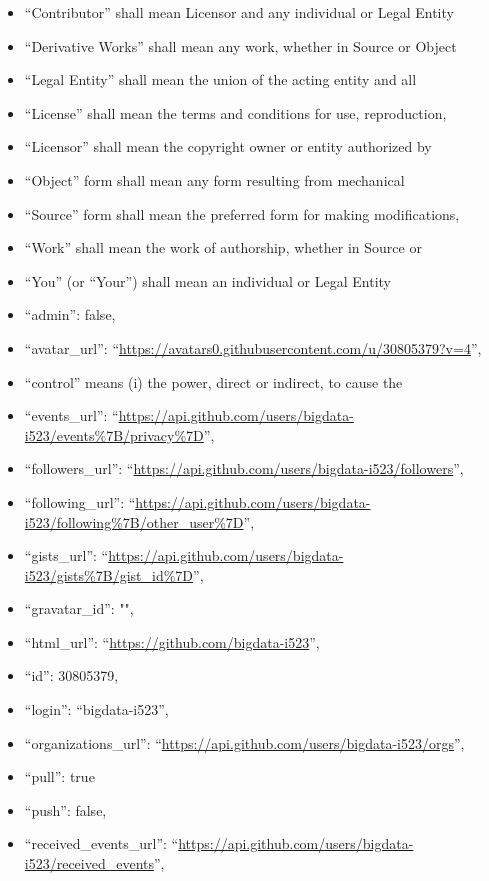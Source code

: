 \begin{itemize}
\item
  ``Contributor'' shall mean Licensor and any individual or Legal Entity
\item
  ``Derivative Works'' shall mean any work, whether in Source or Object
\item
  ``Legal Entity'' shall mean the union of the acting entity and all
\item
  ``License'' shall mean the terms and conditions for use, reproduction,
\item
  ``Licensor'' shall mean the copyright owner or entity authorized by
\item
  ``Object'' form shall mean any form resulting from mechanical
\item
  ``Source'' form shall mean the preferred form for making
  modifications,
\item
  ``Work'' shall mean the work of authorship, whether in Source or
\item
  ``You'' (or ``Your'') shall mean an individual or Legal Entity
\item
  ``admin'': false,
\item
  ``avatar\_url'':
  ``\url{https://avatars0.githubusercontent.com/u/30805379?v=4}'',
\item
  ``control'' means (i) the power, direct or indirect, to cause the
\item
  ``events\_url'':
  ``\url{https://api.github.com/users/bigdata-i523/events\%7B/privacy\%7D}'',
\item
  ``followers\_url'':
  ``\url{https://api.github.com/users/bigdata-i523/followers}'',
\item
  ``following\_url'':
  ``\url{https://api.github.com/users/bigdata-i523/following\%7B/other_user\%7D}'',
\item
  ``gists\_url'':
  ``\url{https://api.github.com/users/bigdata-i523/gists\%7B/gist_id\%7D}'',
\item
  ``gravatar\_id'': "",
\item
  ``html\_url'': ``\url{https://github.com/bigdata-i523}'',
\item
  ``id'': 30805379,
\item
  ``login'': ``bigdata-i523'',
\item
  ``organizations\_url'':
  ``\url{https://api.github.com/users/bigdata-i523/orgs}'',
\item
  ``pull'': true
\item
  ``push'': false,
\item
  ``received\_events\_url'':
  ``\url{https://api.github.com/users/bigdata-i523/received_events}'',

\end{itemize}
